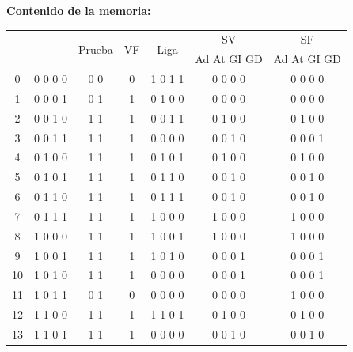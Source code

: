 \documentclass[12pt]{article}
\begin{document}
\textbf{Contenido de la memoria:}\\

\begin{center}
	\begin{tabular}{|c|c|c|c|c|c|c|}
		\hline 
		\multicolumn{2}{|c|}{ \multirow{2}{*}{Estado}} & \multirow{2}{*}{Prueba} & \multirow{2}{*}{VF} & \multirow{2}{*}{Liga} & SV & SF \\ 
		\cline{6-7}
		 \multicolumn{2}{|c|}{}& & & &Ad At GI GD & Ad At GI GD \\ 
		\hline 
		0   & 0 0 0 0 & 0 0 & 0 & 1 0 1 1 & 0 0 0 0 & 0 0 0 0\\ 
		\hline                                               
		1   & 0 0 0 1 & 0 1 & 1 & 0 1 0 0 & 0 0 0 0 & 0 0 0 0\\ 
		\hline                                               
		2   & 0 0 1 0 & 1 1 & 1 & 0 0 1 1 & 0 1 0 0 & 0 1 0 0\\ 
		\hline                                               
		3   & 0 0 1 1 & 1 1 & 1 & 0 0 0 0 & 0 0 1 0 & 0 0 0 1\\ 
		\hline                                               
		4   & 0 1 0 0 & 1 1 & 1 & 0 1 0 1 & 0 1 0 0 & 0 1 0 0\\ 
		\hline                                               
		5   & 0 1 0 1 & 1 1 & 1 & 0 1 1 0 & 0 0 1 0 & 0 0 1 0\\ 
		\hline                                               
		6   & 0 1 1 0 & 1 1 & 1 & 0 1 1 1 & 0 0 1 0 & 0 0 1 0\\ 
		\hline                                               
		7   & 0 1 1 1 & 1 1 & 1 & 1 0 0 0 & 1 0 0 0 & 1 0 0 0\\ 
		\hline                                               
		8   & 1 0 0 0 & 1 1 & 1 & 1 0 0 1 & 1 0 0 0 & 1 0 0 0\\ 
		\hline                                               
		9   & 1 0 0 1 & 1 1 & 1 & 1 0 1 0 & 0 0 0 1 & 0 0 0 1\\ 
		\hline                                               
		10  & 1 0 1 0 & 1 1 & 1 & 0 0 0 0 & 0 0 0 1 & 0 0 0 1\\ 
		\hline                                               
		11  & 1 0 1 1 & 0 1 & 0 & 0 0 0 0 & 0 0 0 0 & 1 0 0 0\\ 
		\hline                                               
		12  & 1 1 0 0 & 1 1 & 1 & 1 1 0 1 & 0 1 0 0 & 0 1 0 0\\ 
		\hline                                               
		13  & 1 1 0 1 & 1 1 & 1 & 0 0 0 0 & 0 0 1 0 & 0 0 1 0\\ 
		\hline 
	\end{tabular} 
\end{center}
\end{document}
